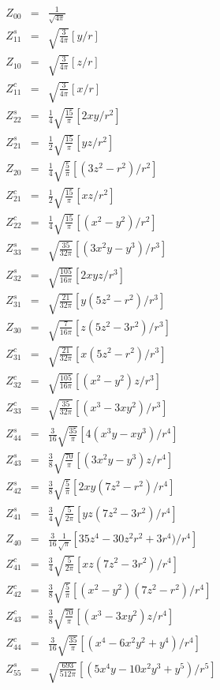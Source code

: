 \begin{eqnarray*}
Z_{00}&=&\frac{1}{\sqrt{4\pi}}\\
\hline
Z^s_{11}&=&\sqrt{\frac{3}{4\pi}}[y/r] \\
Z_{10}&=&\sqrt{\frac{3}{4\pi}}[z/r] \\
Z^c_{11}&=&\sqrt{\frac{3}{4\pi}}[x/r] \\
\hline
Z^s_{22}&=&\frac{1}{4}\sqrt{\frac{15}{\pi}}[2xy/r^2] \\
Z^s_{21}&=&\frac{1}{2}\sqrt{\frac{15}{\pi}}[yz/r^2] \\
Z_{20}&=&\frac{1}{4}\sqrt{\frac{5}{\pi}}[(3z^2-r^2)/r^2] \\
Z^c_{21}&=&\frac{1}{2}\sqrt{\frac{15}{\pi}}[xz/r^2] \\
Z^c_{22}&=&\frac{1}{4}\sqrt{\frac{15}{\pi}}[(x^2-y^2)/r^2] \\
\hline
Z^s_{33}&=&\sqrt{\frac{35}{32\pi}}[(3x^2y-y^3)/r^3] \\
Z^s_{32}&=&\sqrt{\frac{105}{16\pi}}[2xyz/r^3] \\
Z^s_{31}&=&\sqrt{\frac{21}{32\pi}}[y(5z^2-r^2)/r^3] \\
Z_{30}&=&\sqrt{\frac{7}{16\pi}}[z(5z^2-3r^2)/r^3] \\
Z^c_{31}&=&\sqrt{\frac{21}{32\pi}}[x(5z^2-r^2)/r^3] \\
Z^c_{32}&=&\sqrt{\frac{105}{16\pi}}[(x^2-y^2)z/r^3] \\
Z^c_{33}&=&\sqrt{\frac{35}{32\pi}}[(x^3-3xy^2)/r^3] \\
\hline
Z^s_{44}&=&\frac{3}{16}\sqrt{\frac{35}{\pi}}[4(x^3y-xy^3)/r^4] \\
Z^s_{43}&=&\frac{3}{8}\sqrt{\frac{70}{\pi}}[(3x^2y-y^3)z/r^4] \\
Z^s_{42}&=&\frac{3}{8}\sqrt{\frac{5}{\pi}}[2xy(7z^2-r^2)/r^4] \\
Z^s_{41}&=&\frac{3}{4}\sqrt{\frac{5}{2\pi}}[yz(7z^2-3r^2)/r^4] \\
Z_{40}&=&\frac{3}{16}\frac{1}{\sqrt{\pi}}[35z^4-30z^2r^2+3r^4)/r^4] \\
Z^c_{41}&=&\frac{3}{4}\sqrt{\frac{5}{2\pi}}[xz(7z^2-3r^2)/r^4] \\
Z^c_{42}&=&\frac{3}{8}\sqrt{\frac{5}{\pi}}[(x^2-y^2)(7z^2-r^2)/r^4] \\
Z^c_{43}&=&\frac{3}{8}\sqrt{\frac{70}{\pi}}[(x^3-3xy^2)z/r^4] \\
Z^c_{44}&=&\frac{3}{16}\sqrt{\frac{35}{\pi}}[(x^4-6x^2y^2+y^4)/r^4] \\
\hline
Z^s_{55}&=&\sqrt{\frac{693}{512\pi}}[(5x^4y-10x^2y^3+y^5)/r^5] \\

\end{eqnarray*}
